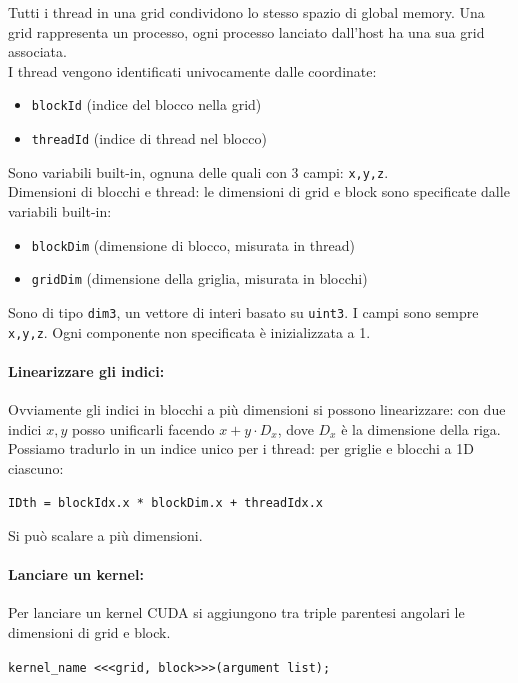 Tutti i thread in una grid condividono lo stesso spazio di global memory. Una grid rappresenta un processo, ogni processo lanciato dall'host ha una sua grid associata.\\

I thread vengono identificati univocamente dalle coordinate: 
\begin{itemize}
	\item \texttt{blockId} (indice del blocco nella grid)
	\item \texttt{threadId} (indice di thread nel blocco)
\end{itemize}
Sono variabili built-in, ognuna delle quali con 3 campi: \texttt{x,y,z}.\\

Dimensioni di blocchi e thread: le dimensioni di grid e block sono specificate dalle variabili built-in: 
\begin{itemize}
	\item \texttt{blockDim} (dimensione di blocco, misurata in thread)
	\item \texttt{gridDim} (dimensione della griglia, misurata in blocchi)
\end{itemize}
Sono di tipo \texttt{dim3}, un vettore di interi basato su \texttt{uint3}. I campi sono sempre \texttt{x,y,z}. Ogni componente non specificata è inizializzata a 1.\\

\paragraph{Linearizzare gli indici:} Ovviamente gli indici in blocchi a più dimensioni si possono linearizzare: con due indici $x,y$ posso unificarli facendo $x + y \cdot D_x$, dove $D_x$ è la dimensione della riga.\\
Possiamo tradurlo in un indice unico per i thread: per griglie e blocchi a 1D ciascuno: 
\begin{center}
	\texttt{IDth = blockIdx.x * blockDim.x + threadIdx.x}
\end{center}
Si può scalare a più dimensioni.\\

\paragraph{Lanciare un kernel:} Per lanciare un kernel CUDA si aggiungono tra triple parentesi angolari le dimensioni di grid e block.
\begin{center}
	\texttt{kernel\_name <<<grid, block>>>(argument list);}
\end{center}

